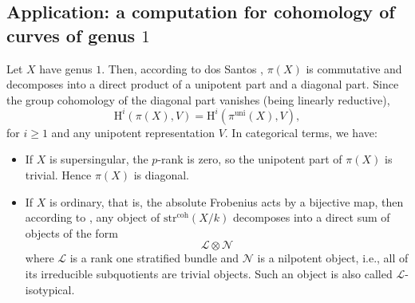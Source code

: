 \documentclass[12pt,a4]{amsart}
\theoremstyle{definition}
\begin{document}
\subsection{Application: a computation for cohomology of curves of genus $1$} 
Let $X$ have genus $1$. 
Then, according to dos Santos
\cite{dSa07}, $\pi(X)$ is commutative and decomposes into a direct product of a unipotent part and a diagonal part. 
 Since the group cohomology of the diagonal part
vanishes (being linearly reductive), 
$$\mathrm{H}^i(\pi(X),V)=
\mathrm{H}^i(\pi^\mathrm{uni}(X),V),$$
 for $i\geq 1$ and 
any unipotent representation $V$. In categorical terms, we have: 
\begin{itemize}
\item If $X$ is supersingular, the $p$-rank is zero, so the unipotent part of $\pi(X)$ is trivial. Hence $\pi(X)$ is diagonal.
\item If $X$ is ordinary, that is, the absolute Frobenius acts by a bijective map, 
then according to \cite{dSa07}, any object of $\mathrm{str}^\mathrm{coh}(X/k)$ decomposes
into a direct sum of objects of the form
$$\mathcal L\otimes\mathcal  N$$
where $\mathcal L$ is a rank one stratified bundle and $\mathcal N$ is a nilpotent
object, i.e., all of its irreducible subquotients
are trivial objects. Such an object is also called $\mathcal L$-isotypical.
\end{itemize}
\end{document}
